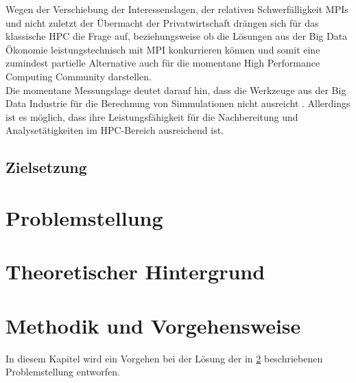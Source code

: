 \documentclass[
	12pt,
	a4paper,
	BCOR10mm,
	DIV14,
	listof=totoc,
	bibliography=totoc,
	headsepline
]{scrreprt}
\begin{document}
Wegen der Verschiebung der Interessenslagen, der relativen Schwerfälligkeit MPIs und nicht zuletzt der Übermacht der Privatwirtschaft drängen sich für das klassische HPC die Frage auf, beziehungsweise ob die Lösungen aus der Big Data Ökonomie leistungstechnisch mit MPI konkurrieren können und somit eine zumindest partielle Alternative auch für die momentane High Performance Computing Community darstellen.\\
Die momentane Messungslage deutet darauf hin, dass die Werkzeuge aus der Big Data Industrie für die Berechnung von Simmulationen nicht ausreicht \cite{HLR}.
Allerdings ist es möglich, dass ihre Leistungsfähigkeit für die Nachbereitung und Analysetätigkeiten im HPC-Bereich ausreichend ist. \\

\section{Zielsetzung}

\chapter{Problemstellung}
\label{Problemstellung}

\chapter{Theoretischer Hintergrund}
\label{Theoretischer Hintergrund}

\chapter{Methodik und Vorgehensweise}
\label{Methodik und Vorgehensweise}
In diesem Kapitel wird ein Vorgehen bei der Lösung der in \ref{Problemstellung} beschriebenen Problemstellung entworfen.
\end{document}
